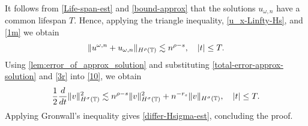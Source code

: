 %
%
It follows from \eqref{Life-span-est} and 
\eqref{bound-approx} that the solutions $u_{\omega,n}$ have a common 
lifespan $T$. Hence, applying the triangle inequality, 
\eqref{u_x-Linfty-Hs}, and \eqref{1m} we obtain  
%
%
\begin{equation}
\|u^{\omega,n} + u_{\omega,n}\|_{H^\rho(\mathbb{T})} \lesssim n^{\rho -s}, 
\quad |t| \le T.
\label{3r}
\end{equation}
%
%
%
%
%
%
Using \cref{lem:error_of_approx_solution} and
substituting \eqref{total-error-approx-solution} and \eqref{3r}
into \eqref{10}, we obtain
%
%
\begin{equation}
\begin{split}
\frac{1}{2}\frac{d}{dt}\|v\|_{H^\sigma(\mathbb{T})}^2 \lesssim n^{\rho - s}
\|v\|_{H^\sigma(\mathbb{T})}^2 + n^{-r_s}\|v\|_{H^\sigma(\mathbb{T})}, \quad |t| \le T.
\label{200r}
\end{split}
\end{equation}
%
%
Applying Gronwall's inequality gives \eqref{differ-Hsigma-est}, concluding 
the proof. \qquad \qedsymbol
%
%
%
%
%
%
%

